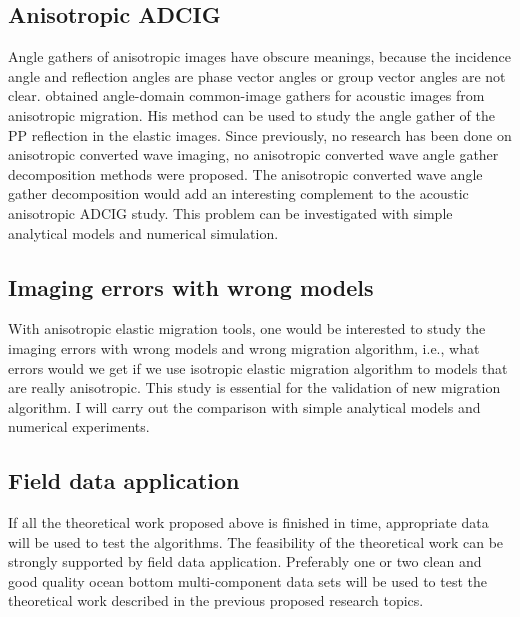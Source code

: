 \subsection{Anisotropic ADCIG}
Angle gathers of anisotropic images have obscure meanings, because the incidence angle and reflection angles are phase vector angles or group vector angles are not clear. \cite{biondi:S81} obtained angle-domain common-image gathers for acoustic images from anisotropic migration. His method can be used to study the angle gather of the PP reflection in the elastic images. Since previously, no research has been done on anisotropic converted wave imaging, no anisotropic converted wave angle gather decomposition methods were proposed. The anisotropic converted wave angle gather decomposition would add an interesting complement to the acoustic anisotropic ADCIG study. This problem can be investigated with simple analytical models and numerical simulation.


\subsection{Imaging errors with wrong models}
With anisotropic elastic migration tools, one would be interested to study the imaging errors with wrong models and wrong migration algorithm, i.e., what errors would we get if we use isotropic elastic migration algorithm to models that are really anisotropic. This study is essential for the validation of new migration algorithm. I will carry out the comparison with simple analytical models and numerical experiments.

\subsection{Field data application}
If all the theoretical work proposed above is finished in time, appropriate data will be used to test the algorithms. The feasibility of the theoretical work can be strongly supported by field data application. 
Preferably one or two clean and good quality ocean bottom multi-component data sets will be used to test the theoretical work described in the previous proposed research topics.



